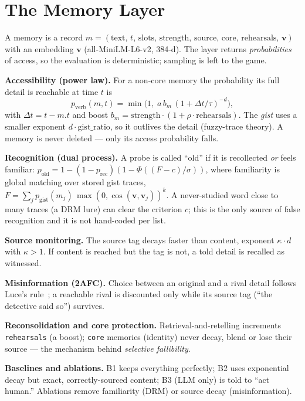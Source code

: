 \documentclass[conference]{IEEEtran}
\begin{document}
\section{The Memory Layer}
A memory is a record $m=(\text{text},\,t,\,\text{slots},\,\text{strength},\,
\text{source},\,\text{core},\,\text{rehearsals},\,\mathbf{v})$ with an embedding
$\mathbf{v}$ (all-MiniLM-L6-v2, 384-d). The layer returns \emph{probabilities} of
access, so the evaluation is deterministic; sampling is left to the game.

\textbf{Accessibility (power law).} For a non-core memory the probability its full
detail is reachable at time $t$ is
\begin{equation}
p_{\text{verb}}(m,t)=\min\!\big(1,\;a\,b_m\,(1+\Delta t/\tau)^{-d}\big),
\end{equation}
with $\Delta t=t-m.t$ and boost $b_m=\text{strength}\cdot(1+\rho\cdot
\text{rehearsals})$. The \emph{gist} uses a smaller exponent $d\cdot
\text{gist\_ratio}$, so it outlives the detail (fuzzy-trace theory). A memory is
never deleted --- only its access probability falls.

\textbf{Recognition (dual process).} A probe is called ``old'' if it is
recollected \emph{or} feels familiar:
$p_{\text{old}}=1-(1-p_{\text{rec}})(1-\Phi((F-c)/\sigma))$, where familiarity is
global matching over stored gist traces,
$F=\sum_j p_{\text{gist}}(m_j)\,\max(0,\cos(\mathbf{v},\mathbf{v}_j))^{k}$. A
never-studied word close to many traces (a DRM lure) can clear the criterion $c$;
this is the only source of false recognition and it is not hand-coded per list.

\textbf{Source monitoring.} The source tag decays faster than content, exponent
$\kappa\cdot d$ with $\kappa>1$. If content is reached but the tag is not, a told
detail is recalled as witnessed.

\textbf{Misinformation (2AFC).} Choice between an original and a rival detail
follows Luce's rule~\cite{luce1959}; a reachable rival is discounted only while its
source tag (``the detective said so'') survives.

\textbf{Reconsolidation and core protection.} Retrieval-and-retelling increments
\texttt{rehearsals} (a boost); \texttt{core} memories (identity) never decay, blend
or lose their source --- the mechanism behind \emph{selective fallibility}.

\textbf{Baselines and ablations.} B1 keeps everything perfectly; B2 uses
exponential decay but exact, correctly-sourced content; B3 (LLM only) is told to
``act human.'' Ablations remove familiarity (DRM) or source decay (misinformation).
\end{document}
